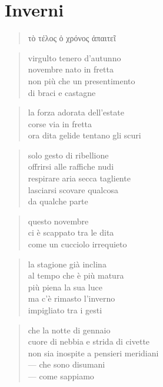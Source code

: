 \chapter{Inverni}

\begin{verse}
    \begin{otherlanguage}{greek}
        τὸ τέλος ὁ χρόνος ἀπαιτεῖ
    \end{otherlanguage}
\end{verse}


\begin{verse}
    virgulto tenero d’autunno\\
    novembre nato in fretta\\
    non più che un presentimento\\
    di braci e castagne
\end{verse}

\begin{verse}
    la forza adorata dell’estate\\
    corse via in fretta\\
    ora dita gelide tentano gli scuri
\end{verse}

\clearpage


\begin{verse}
    solo gesto di ribellione\\
    offrirsi alle raffiche nudi\\
    respirare aria secca tagliente\\
    lasciarsi scovare qualcosa\\
    da qualche parte
\end{verse}

\clearpage


\begin{verse}
    questo novembre\\
    ci è scappato tra le dita\\
    come un cucciolo irrequieto
\end{verse}

\clearpage


\begin{verse}
    la stagione già inclina\\
    al tempo che è più matura\\
    più piena la sua luce\\
    ma c’è rimasto l’inverno\\
    impigliato tra i gesti
\end{verse}

\clearpage


\begin{verse}
    che la notte di gennaio\\
    cuore di nebbia e strida di civette\\
    non sia inospite a pensieri meridiani\\
    — che sono disumani\\
    — come sappiamo
\end{verse}

